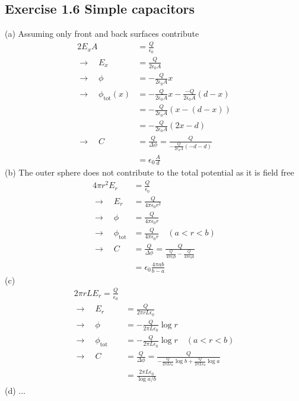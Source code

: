 \documentclass[10pt,a4paper]{book}
\theoremstyle{definition}
\begin{document}
\subsection{Exercise 1.6 Simple capacitors}
(a) Assuming only front and back surfaces contribute
\begin{align}
2E_xA&=\frac{Q}{\epsilon_0}\\
\rightarrow\quad E_x&=\frac{Q}{2\epsilon_0A}\\
\rightarrow\quad \phi&=-\frac{Q}{2\epsilon_0A}x\\
\rightarrow\quad \phi_\text{tot}(x)&=-\frac{Q}{2\epsilon_0A}x-\frac{-Q}{2\epsilon_0A}(d-x)\\
&=-\frac{Q}{2\epsilon_0A}(x-(d-x))\\
&=-\frac{Q}{2\epsilon_0A}(2x-d)\\
\rightarrow\quad C&=\frac{Q}{\Delta\phi}=\frac{Q}{-\frac{Q}{2\epsilon_0A}(-d-d)}\\
&=\epsilon_0\frac{A}{d}
\end{align}
(b) The outer sphere does not contribute to the total potential as it is field free
\begin{align}
4\pi r^2 E_r&=\frac{Q}{\epsilon_0}\\
\rightarrow\quad E_r&=\frac{Q}{4\pi\epsilon_0 r^2}\\
\rightarrow\quad \phi&=\frac{Q}{4\pi\epsilon_0 r}\\
\rightarrow\quad \phi_\text{tot}&=\frac{Q}{4\pi\epsilon_0 r}\quad(a<r<b)\\
\rightarrow\quad C&=\frac{Q}{\Delta\phi}=\frac{Q}{\frac{Q}{4\pi\epsilon_0 b}-\frac{Q}{4\pi\epsilon_0 a}}\\
&=\epsilon_0\frac{4\pi ab}{b-a}
\end{align}
(c) 
\begin{align}
2\pi r L E_r=\frac{Q}{\epsilon_0}\\
\rightarrow\quad E_r&=\frac{Q}{2\pi r L\epsilon_0}\\
\rightarrow\quad \phi&=-\frac{Q}{2\pi L\epsilon_0}\log r\\
\rightarrow\quad \phi_\text{tot}&=-\frac{Q}{2\pi L\epsilon_0}\log r\quad(a<r<b)\\
\rightarrow\quad C&=\frac{Q}{\Delta\phi}=\frac{Q}{-\frac{Q}{2\pi L\epsilon_0}\log b+\frac{Q}{2\pi L\epsilon_0}\log a}\\
&=\frac{2\pi L\epsilon_0}{\log a/b}
\end{align}
(d) ...
\end{document}
